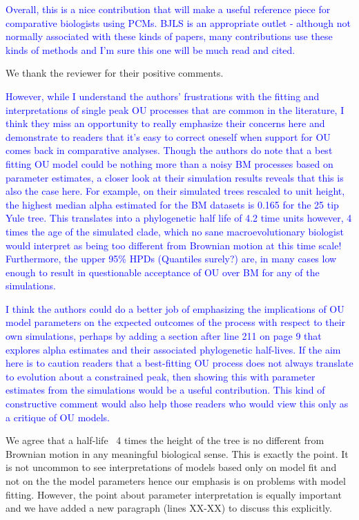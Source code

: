 \documentclass[12pt]{letter}
\begin{document}
\begin{letter}{}
\textcolor{blue}{Overall, this is a nice contribution that will make a useful reference piece for comparative biologists using PCMs. BJLS is an appropriate outlet - although not normally associated with these kinds of papers, many contributions use these kinds of methods and I'm sure this one will be much read and cited.}

We thank the reviewer for their positive comments.

\textcolor{blue}{However, while I understand the authors’ frustrations with the fitting and interpretations of single peak OU processes that are common in the literature, I think they miss an opportunity to really emphasize their concerns here and demonstrate to readers that it's easy to correct oneself when support for OU comes back in comparative analyses. Though the authors do note that a best fitting OU model could be nothing more than a noisy BM processes based on parameter estimates, a closer look at their simulation results reveals that this is also the case here. For example, on their simulated trees rescaled to unit height, the highest median alpha estimated for the BM datasets is 0.165 for the 25 tip Yule tree. This translates into a phylogenetic half life of 4.2 time units however, 4 times the age of the simulated clade, which no sane macroevolutionary biologist would interpret as being too different from Brownian motion at this time scale! Furthermore, the upper 95\% HPDs (Quantiles surely?) are, in many cases low enough to result in questionable acceptance of OU over BM for any of the simulations.}

\textcolor{blue}{I think the authors could do a better job of emphasizing the implications of OU model parameters on the expected outcomes of the process with respect to their own simulations, perhaps by adding a section after line 211 on page 9 that explores alpha estimates and their associated phylogenetic half-lives. If the aim here is to caution readers that a best-fitting OU process does not always translate to evolution about a constrained peak, then showing this with parameter estimates from the simulations would be a useful contribution. This kind of constructive comment would also help those readers who would view this only as a critique of OU models.}

We agree that a half-life ~4 times the height of the tree is no different from Brownian motion in any meaningful biological sense. This is exactly the point. It is not uncommon to see interpretations of models based only on model fit and not on the the model parameters hence our emphasis is on problems with model fitting. However, the point about parameter interpretation is equally important and we have added a new paragraph (lines XX-XX) %
to discuss this explicitly. 


\end{letter}
\end{document}
